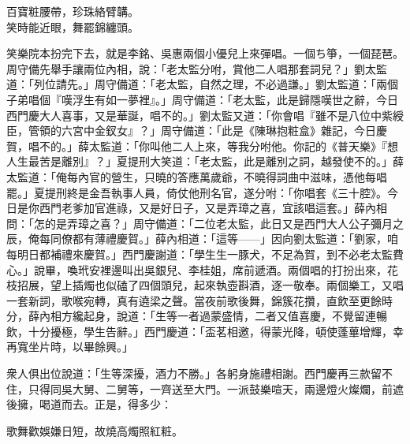 \begin{myquote}
百寶粧腰帶，珍珠絡臂韝。\\笑時能近眼，舞罷錦纏頭。
\end{myquote}

笑樂院本扮完下去，就是李銘、吳惠兩個小優兒上來彈唱。一個ち箏，一個琵琶。周守備先舉手讓兩位內相，說：「老太監分咐，賞他二人唱那套詞兒？」劉太監道：「列位請先。」周守備道：「老太監，自然之理，不必過謙。」劉太監道：「兩個子弟唱個『嘆浮生有如一夢裡』。」{}周守備道：「老太監，此是歸隱嘆世之辭，今日西門慶大人喜事，又是華誕，唱不的。」劉太監又道：「你會唱『雖不是八位中紫綬臣，管領的六宮中金釵女』？」{}周守備道：「此是《陳琳抱粧盒》雜記，今日慶賀，唱不的。」薛太監道：「你叫他二人上來，等我分咐他。你記的《普天樂》『想人生最苦是離別』？」{}夏提刑大笑道：「老太監，此是離別之詞，越發使不的。」薛太監道：「俺每內官的營生，只曉的答應萬歲爺，不曉得詞曲中滋味，憑他每唱罷。」{}夏提刑終是金吾執事人員，倚仗他刑名官，遂分咐：「你唱套《三十腔》。今日是你西門老爹加官進祿，又是好日子，又是弄璋之喜，宜該唱這套。」薛內相問：「怎的是弄璋之喜？」{}周守備道：「二位老太監，此日又是西門大人公子彌月之辰，俺每同僚都有薄禮慶賀。」薛內相道：「這等——」因向劉太監道：「劉家，咱每明日都補禮來慶賀。」西門慶謝道：「學生生一豚犬，不足為賀，到不必老太監費心。」說畢，喚玳安裡邊叫出吳銀兒、李桂姐，席前遞酒。兩個唱的打扮出來，花枝招展，望上插燭也似磕了四個頭兒，起來執壺斟酒，逐一敬奉。兩個樂工，又唱一套新詞，歌喉宛轉，真有遶梁之聲。當夜前歌後舞，錦簇花攢，直飲至更餘時分，薛內相方纔起身，說道：「生等一者過蒙盛情，二者又值喜慶，不覺留連暢飲，十分擾極，學生告辭。」西門慶道：「盃茗相邀，得蒙光降，頓使蓬蓽增輝，幸再寬坐片時，以畢餘興。」

衆人俱出位說道：「生等深擾，酒力不勝。」各躬身施禮相謝。西門慶再三款留不住，只得同吳大舅、二舅等，一齊送至大門。一派鼓樂喧天，兩邊燈火燦爛，前遮後擁，喝道而去。正是，得多少：

\begin{myquote}
歌舞歡娛嫌日短，故燒高燭照紅粧。
\end{myquote}

